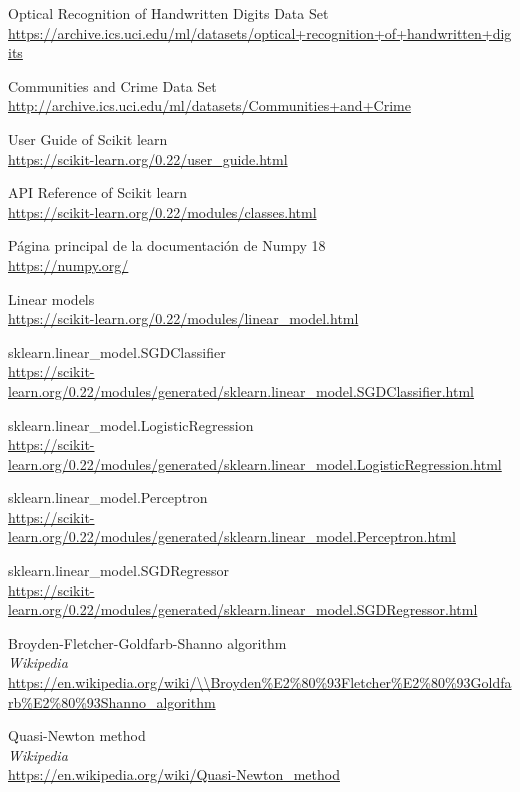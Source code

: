 \begin{thebibliography}{9}

Optical Recognition of Handwritten Digits Data Set
\\\url{https://archive.ics.uci.edu/ml/datasets/optical+recognition+of+handwritten+digits}

Communities and Crime Data Set
\\\url{http://archive.ics.uci.edu/ml/datasets/Communities+and+Crime}

User Guide of Scikit learn
\\\url{https://scikit-learn.org/0.22/user\_guide.html}

API Reference of Scikit learn
\\\url{https://scikit-learn.org/0.22/modules/classes.html}

Página principal de la documentación de Numpy 18
\\\url{https://numpy.org/}

Linear models
\\\url{https://scikit-learn.org/0.22/modules/linear\_model.html}

sklearn.linear\_model.SGDClassifier
\\\url{https://scikit-learn.org/0.22/modules/generated/sklearn.linear\_model.SGDClassifier.html}

sklearn.linear\_model.LogisticRegression
\\\url{https://scikit-learn.org/0.22/modules/generated/sklearn.linear\_model.LogisticRegression.html}

sklearn.linear\_model.Perceptron
\\\url{https://scikit-learn.org/0.22/modules/generated/sklearn.linear\_model.Perceptron.html}

sklearn.linear\_model.SGDRegressor
\\\url{https://scikit-learn.org/0.22/modules/generated/sklearn.linear\_model.SGDRegressor.html}

Broyden-Fletcher-Goldfarb-Shanno algorithm
\\\textit{Wikipedia}
\\\url{https://en.wikipedia.org/wiki/\\Broyden\%E2\%80\%93Fletcher\%E2\%80\%93Goldfarb\%E2\%80\%93Shanno\_algorithm}

Quasi-Newton method
\\\textit{Wikipedia}
\\\url{https://en.wikipedia.org/wiki/Quasi-Newton\_method}


\end{thebibliography}
